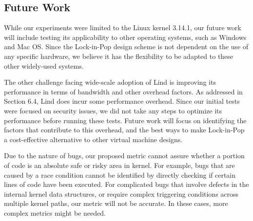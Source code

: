 \subsection{Future Work}

While our experiments were limited to the Linux kernel 3.14.1, our future work
will include testing its applicability to other operating systems, such as
Windows and Mac OS. Since the Lock-in-Pop design scheme is not dependent on the use of any
specific hardware, we believe it has the flexibility to be adapted to these other
widely-used systems.

The other challenge facing wide-scale adoption of Lind is improving its
performance in terms of bandwidth and other overhead factors. As addressed in
Section 6.4, Lind does incur some performance overhead. Since our initial tests
were focused on security issues, we did not take any steps to optimize
its performance before running these tests. Future work will focus on identifying
the factors that contribute to this overhead, and the best ways to make Lock-in-Pop
a cost-effective alternative to other virtual machine designs.

Due to the nature of bugs, our proposed metric cannot assure whether a portion of code
is an absolute safe or risky area in kernel.
For example, bugs that are caused
by a race condition cannot be identified by directly checking if certain lines of
code have been executed. For complicated bugs that involve defects in the internal
kernel data structures, or require complex triggering conditions across multiple
kernel paths, our metric will not be accurate.
In these cases, more complex metrics might be needed.




